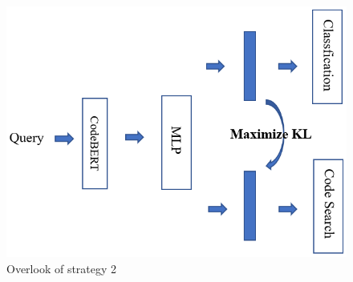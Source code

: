 \begin{figure}[htb]
	\centering
	\includegraphics[width=0.8\linewidth]{imgs/st2.png}
	\caption{Overlook of strategy 2}
	\label{fig:st2}
\end{figure}

